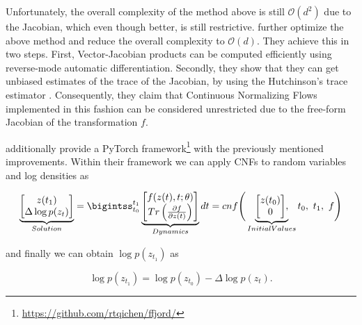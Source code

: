 Unfortunately, the overall complexity of the method above is still $ \mathcal{O}(d^2) $ due to the Jacobian, which even though better, is still restrictive. \citet{grathwohl2018ffjord} further optimize the above method and reduce the overall complexity to $ \mathcal{O}(d) $. They achieve this in two steps. First, Vector-Jacobian products can be computed efficiently using reverse-mode automatic differentiation. Secondly, they show that they can get unbiased estimates of the trace of the Jacobian, by using the Hutchinson’s trace estimator \citep{hutchinson1990stochastic}. Consequently, they claim that Continuous Normalizing Flows implemented in this fashion can be considered unrestricted due to the free-form Jacobian of the transformation $ f $.

\citet{grathwohl2018ffjord} additionally provide a PyTorch framework\footnote{\url{https://github.com/rtqichen/ffjord/}} with the previously mentioned improvements. Within their framework we can apply CNFs to random variables and log densities as

\begin{displaymath}
    \underbrace{
        \begin{matrix}
            \begin{bmatrix}
                z(t_1) \\
                \Delta \log p(z_t) %
            \end{bmatrix}
        \end{matrix}
    }_{Solution}
    =
        \bigintss_{t_0}^{t_1}
        \underbrace{
            \begin{matrix}
                \begin{bmatrix}
                    f(z(t), t; \theta) \\
                    Tr \left ( \frac{\partial f}{\partial z(t)} \right)
                \end{bmatrix}
            \end{matrix}
    }_{Dynamics}
    dt = cnf
    \Bigg (
        \underbrace{
            \begin{matrix}
                \begin{bmatrix}
                    z(t_0) \\
                    0
                \end{bmatrix}
            \end{matrix},
        }_{Initial Values}
        t_0, \ t_1, \ f
    \Bigg )
\end{displaymath}

and finally we can obtain $ \log p(z_{t_1}) $  as 

\begin{displaymath}
    \log p(z_{t_1}) = \log p(z_{t_0}) - \Delta \log p(z_t).
\end{displaymath}

